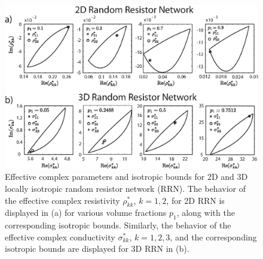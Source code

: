 \documentclass{cmslatex}
\begin{document}
%
\begin{figure}[t]
  \centerline{\includegraphics[scale=0.65]{2D_GammaCurl_and_3D_Gamma_Bounds.eps}} 
\caption{Effective complex parameters and isotropic bounds for 2D and
  3D locally isotropic random resistor network (RRN). The behavior of
  the effective complex resistivity $\rho^*_{kk}$, $k=1,2$, for 2D RRN is
  displayed in (a) for various volume fractions $p_1$, along with the
  corresponding isotropic bounds. Similarly, the
  behavior of the effective complex conductivity $\sigma^*_{kk}$,
  $k=1,2,3$, and the corresponding isotropic bounds are displayed for
  3D RRN in (b). 
        }
\label{fig:3D_and_3D_Bounds}
\end{figure}
%
\end{document}
